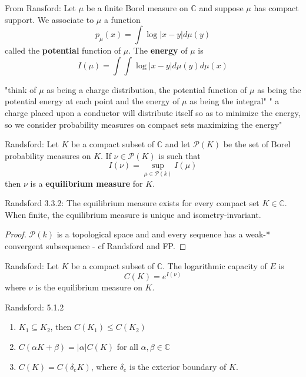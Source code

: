 \begin{definition} 
From Ransford:
Let $\mu$ be a finite Borel measure on $\mathbb{C}$ and suppose $\mu$ has compact support.  We associate to $\mu$ a function
\[p_\mu (x) =\int \log \lvert x - y \rvert d\mu(y)\] called the \textbf{potential} function of $\mu$. The \textbf{energy} of $\mu$ is 
\[I(\mu) =\int \int \log \lvert x - y \rvert d\mu(y) d\mu(x)\]
\end{definition}

"think of $\mu$ as being a charge distribution, the potential function of $\mu$ as being the potential energy at each point and the energy of $\mu$ as being the integral"
" a charge placed upon a conductor will distribute itself so as to minimize the energy, so we consider probability measures on compact sets maximizing the energy"


\begin{definition}
Randsford: Let $K$ be a compact subset of $\mathbb{C}$ and let $\mathcal{P}(K)$ be the set of Borel probability measures on $K$. If $\nu \in \mathcal{P}(K)$ is such that 
\[I(\nu) = \sup_{\mu \in \mathcal{P}(k)} I(\mu)\] then $\nu$ is a \textbf{equilibrium measure} for $K$.
\end{definition}

\begin{proposition}
Randsford 3.3.2: The equilibrium measure exists for every compact set $K \in \mathbb{C}$. When finite, the equilibrium measure is unique and isometry-invariant.
\end{proposition}

\begin{proof}
$\mathcal{P}(k)$ is a topological space and and every sequence has a weak-* convergent subsequence - cf Randsford and FP.
\end{proof}


\begin{definition}
Randsford: Let $K$ be a compact subset of $\mathbb{C}$. The logarithmic capacity of $E$ is 
\[C(K) = e^{I(\nu)}\] where $\nu$ is the equilibrium measure on $K$.
\end{definition}

\begin{proposition}
Randsford: 5.1.2
\begin{enumerate}
\item $K_1 \subseteq K_2$, then $C(K_1) \leq C(K_2)$
\item $C(\alpha K + \beta) = \lvert \alpha \rvert C(K)$ for all $\alpha, \beta \in \mathbb{C}$
\item $C(K) = C(\delta_eK)$, where $\delta_e$ is the exterior boundary of $K$.
\end{enumerate}
\end{proposition}

